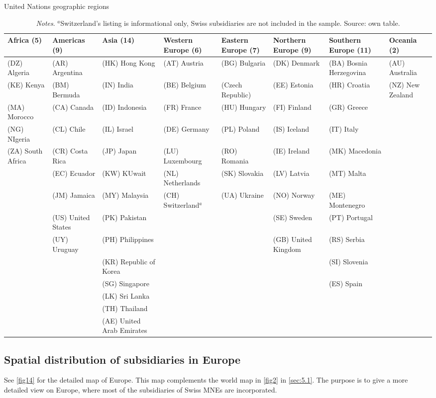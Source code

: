 \documentclass[10pt,twocolumn,oneside,cmyk]{article}
\begin{document}
\begin{sidewaystable}[!]
\footnotesize
 \begin{center}
 \captionsetup{width=0.9\linewidth}
  \caption{United Nations geographic regions}\label{tab17}
   \begin{tabularx}{0.9\linewidth}{l l l l l l l l}
   \toprule
   Africa (5) &Americas (9) &Asia (14) &Western Europe (6) &Eastern Europe (7) &Northern Europe (9) &Southern Europe (11) &Oceania (2)\\
   \midrule
   (DZ) Algeria &(AR) Argentina &(HK) Hong Kong &(AT) Austria &(BG) Bulgaria &(DK) Denmark &(BA) Bosnia Herzegovina &(AU) Australia\\
   (KE) Kenya &(BM) Bermuda &(IN) India &(BE) Belgium &(Czech Republic) &(EE) Estonia &(HR) Croatia &(NZ) New Zealand\\
   (MA) Morocco &(CA) Canada &(ID) Indonesia &(FR) France &(HU) Hungary &(FI) Finland &(GR) Greece\\
   (NG) NIgeria &(CL) Chile &(IL) Israel &(DE) Germany &(PL) Poland &(IS) Iceland &(IT) Italy\\
   (ZA) South Africa &(CR) Costa Rica &(JP) Japan &(LU) Luxembourg &(RO) Romania &(IE) Ireland &(MK) Macedonia\\
   &(EC) Ecuador &(KW) KUwait &(NL) Netherlands &(SK) Slovakia &(LV) Latvia &(MT) Malta\\
   &(JM) Jamaica &(MY) Malaysia &(CH) Switzerland$^a$ &(UA) Ukraine &(NO) Norway &(ME) Montenegro\\
   &(US) United States &(PK) Pakistan & & &(SE) Sweden &(PT) Portugal\\
   &(UY) Uruguay &(PH) Philippines & & &(GB) United Kingdom &(RS) Serbia\\
   & &(KR) Republic of Korea & & & &(SI) Slovenia\\
   & &(SG) Singapore & & & &(ES) Spain\\
   & &(LK) Sri Lanka\\
   & &(TH) Thailand\\
   & &(AE) United Arab Emirates\\
   \bottomrule
   \end{tabularx}
  \caption*{\footnotesize{\textit{Notes}. $^a$Switzerland's listing is informational only, Swiss subsidiaries are not included in the sample. Source: own table.}}
 \end{center}
\end{sidewaystable}

\subsection{Spatial distribution of subsidiaries in Europe}\label{app:C3}
See \cref{fig14} for the detailed map of Europe. This map complements the world map in \cref{fig2} in \cref{sec:5.1}. The purpose is to give a more detailed view on Europe, where most of the subsidiaries of Swiss MNEs are incorporated.
\end{document}
